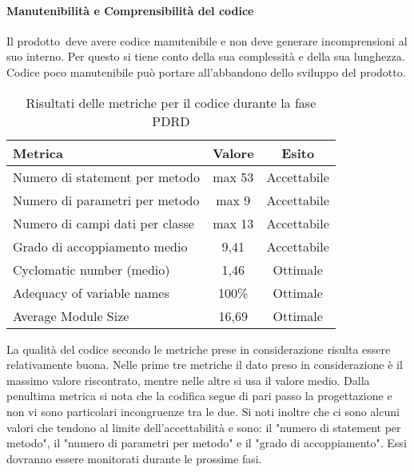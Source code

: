\documentclass[../PianoDiQualifica.tex]{subfiles}
\begin{document}
\begin{appendices}
			\paragraph{Manutenibilità e Comprensibilità del codice}
				Il prodotto\g\ deve avere codice manutenibile e non deve generare incomprensioni al suo interno. Per questo si tiene conto della sua complessità e della sua lunghezza. Codice poco manutenibile può portare all'abbandono dello sviluppo del prodotto\g.
			\begin{table}[H]
				\centering
				\begin{tabular}{l * {2}{c}}
					\toprule
					\textbf{Metrica} & \textbf{Valore} & \textbf{Esito} \\
					\midrule
					Numero di statement per metodo & max 53 & Accettabile \\
					Numero di parametri per metodo & max 9 & Accettabile \\
					Numero di campi dati per classe & max 13 & Accettabile \\
					Grado di accoppiamento medio & 9,41 & Accettabile \\
					Cyclomatic number (medio) & 1,46 & Ottimale \\
					Adequacy of variable names & 100\% & Ottimale \\
					Average Module Size & 16,69 & Ottimale \\
					\midrule
				\end{tabular}
				\caption{Risultati delle metriche per il codice durante la fase PDRD}
				\label{tab:numero_statement_metodo}
			\end{table}
			La qualità del codice secondo le metriche prese in considerazione risulta essere relativamente buona. Nelle prime tre metriche il dato preso in considerazione è il massimo valore riscontrato, mentre nelle altre si usa il valore medio. Dalla penultima metrica si nota che la codifica segue di pari passo la progettazione e non vi sono particolari incongruenze tra le due. Si noti inoltre che ci sono alcuni valori che tendono al limite dell'accettabilità e sono: il "numero di statement per metodo", il "numero di parametri per metodo"  e il "grado di accoppiamento". Essi dovranno essere monitorati durante le prossime fasi.  
			

\end{appendices}
\end{document}
